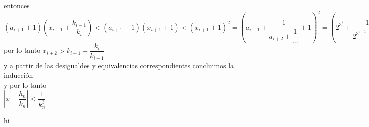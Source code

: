 \documentclass[11pt, article]{memoir}
\begin{document}
entonces\\
$(a_{i+1}+1)(x_{i+1}+\dfrac{k_{i-1}}{k_{i}})<(a_{i+1}+1)(x_{i+1}+1)<(x_{i+1}+1)^{2}=\left(a_{i+1}+\dfrac{1}{a_{i+2}+\dfrac{1}{...}}+1\right)^{2}=\left(2^{3^{i}}+\dfrac{1}{2^{3^{i+1}}+\dfrac{1}{...}}+1\right)^{2}<2^{3^{i+1}}+\dfrac{1}{2^{3^{i+2}}+\dfrac{1}{...}}=x_{n+1}$\\
por lo tanto $x_{i+2}>k_{i+1}-\dfrac{k_{i}}{k_{i+1}}$\\
y a partir de las desigualdes y equivalencias correspondientes concluimos la inducción\\
y por lo tanto\\
$\left|x-\dfrac{h_{n}}{k_{n}}\right|<\dfrac{1}{k_{n}^{3}}$\\
\begin{flushright}
hi
\end{flushright}
\end{document}
